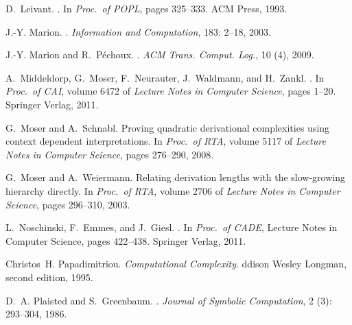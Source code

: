 \documentclass{LMCS}
\begin{document}
\begin{thebibliography}{59}
D.~Leivant.
.
\newblock In \emph{Proc.\ of  POPL}, pages 325--333. ACM Press, 1993.

J.-Y. Marion.
.
\newblock \emph{Information and Computation}, 183: 2--18, 2003.

J.-Y. Marion and R.~P{\'e}choux.
.
\newblock \emph{ACM Trans. Comput. Log.}, 10 (4), 2009.

A.~Middeldorp, G.~Moser, F.~Neurauter, J.~Waldmann, and H.~Zankl.
.
\newblock In \emph{Proc.\ of  CAI}, volume 6472 of \emph{Lecture Notes
  in Computer Science}, pages 1--20. Springer Verlag, 2011.

G.~Moser and A.~Schnabl.
\newblock Proving quadratic derivational complexities using context dependent
  interpretations.
\newblock In \emph{Proc.\ of  RTA}, volume 5117 of \emph{Lecture Notes
  in Computer Science}, pages 276--290, 2008.

G.~Moser and A.~Weiermann.
\newblock Relating derivation lengths with the slow-growing hierarchy directly.
\newblock In \emph{Proc.\ of  RTA}, volume 2706 of \emph{Lecture Notes
  in Computer Science}, pages 296--310, 2003.

L.~Noschinski, F.~Emmes, and J.~Giesl.
.
\newblock In \emph{Proc.\ of  CADE}, Lecture Notes in Computer Science,
  pages 422--438. Springer Verlag, 2011.

Christos~H. Papadimitriou.
\newblock \emph{{C}omputational {C}omplexity}.
ddison {W}esley {L}ongman, second edition, 1995.

D.~A. Plaisted and S.~Greenbaum.
.
\newblock \emph{Journal of Symbolic Computation}, 2 (3):
  293--304, 1986.


\end{thebibliography}
\end{document}
